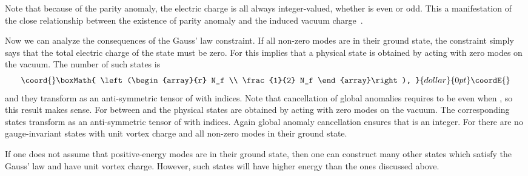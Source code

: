 \documentclass[a4paper,12pt, amsfonts, amssymb]{article}
\begin{document}
Note that because of the parity anomaly, the electric charge is all always integer-valued, whether \coordHE{} is even or odd. This a manifestation of
the close relationship between the existence of parity anomaly
and the induced vacuum charge~\cite{NS}.

Now we can analyze the consequences of the Gauss' law constraint.
If all non-zero modes are in their ground state, the constraint
simply says that the total electric charge of the state must be
zero. 
For \coordHE{} this implies that a physical state is obtained
by acting with \coordHE{} zero modes on the vacuum. The number of
such states is
$$\coord{}\boxMath{
\left(\begin{array}{r} N_f \\ \frac{1}{2} N_f \end{array}\right),
}{dollar}{0pt}\coordE{}$$
and they transform as an anti-symmetric tensor of \coordHE{}
with \coordHE{} indices. Note that cancellation of global anomalies
requires \coordHE{} to be even when \coordHE{}, so this result makes sense.
For \coordHE{} between
\coordHE{} and \coordHE{} the physical states are obtained by acting
with \coordHE{} zero modes on the vacuum. The corresponding states
transform as an anti-symmetric tensor of \coordHE{} with
\coordHE{} indices. Again global anomaly cancellation ensures
that \coordHE{} is an integer. For \coordHE{} there 
are no gauge-invariant states with unit vortex charge and all
non-zero modes in their ground state.
 

If one does not assume that positive-energy modes are in their
ground state, then one can construct many other states which
satisfy the Gauss' law and have unit vortex charge. However,
such states will have higher energy than the ones discussed
above. 
\end{document}
